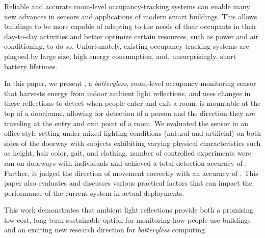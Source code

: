 Reliable and accurate room-level occupancy-tracking systems can enable many new advances in sensors and applications of modern smart buildings.
This allows buildings to be more capable of adapting to the needs of their occupants in their day-to-day activities and better optimize certain resources, such as power and air conditioning, to do so.
Unfortunately, existing occupancy-tracking systems are plagued by large size, high energy consumption, and, unsurprisingly, short battery lifetimes.

In this paper, we present \sysname, a \textit{batteryless}, room-level occupancy monitoring sensor that harvests energy from indoor ambient light reflections, and uses changes in these reflections to detect when people enter and exit a room.
\sysname is mountable at the top of a doorframe, allowing for detection of a person and the direction they are traveling at the entry and exit point of a room.
We evaluated the \sysname sensor in an office-style setting under mixed lighting conditions (natural and artificial) on both sides of the doorway with subjects exhibiting varying physical characteristics such as height, hair color, gait, and clothing.
\numExp number of controlled experiments were ran on \numDoors doorways with \numPeople individuals and achieved a total detection accuracy of \SysAccuracy.
Further, it judged the direction of movement correctly with an accuracy of \dirAccuracy.
This paper also evaluates and discusses various practical factors that can impact the performance of the current system in actual deployments.

This work demonstrates that ambient light reflections provide both a promising low-cost, long-term sustainable option for monitoring how people use buildings and an exciting new research direction for \textit{batteryless} computing.
